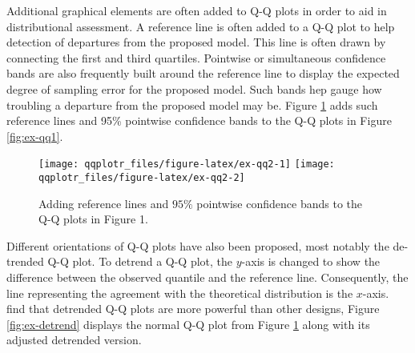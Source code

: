 Additional graphical elements are often added to Q-Q plots in order to
aid in distributional assessment. A reference line is often added to a
Q-Q plot to help detection of departures from the proposed model. This
line is often drawn by connecting the first and third quartiles.
Pointwise or simultaneous confidence bands are also frequently built
around the reference line to display the expected degree of sampling
error for the proposed model. Such bands hep gauge how troubling a
departure from the proposed model may be. Figure \ref{fig:ex-qq2} adds
such reference lines and 95\% pointwise confidence bands to the Q-Q
plots in Figure \ref{fig:ex-qq1}.

\begin{Schunk}
\begin{figure}

{\centering \texttt{[image: qqplotr\_files/figure-latex/ex-qq2-1]} \texttt{[image: qqplotr\_files/figure-latex/ex-qq2-2]} 

}

\caption[Adding reference lines and $95\%$ pointwise confidence bands to the Q-Q plots in Figure 1]{Adding reference lines and $95\%$ pointwise confidence bands to the Q-Q plots in Figure 1.}\label{fig:ex-qq2}
\end{figure}
\end{Schunk}

Different orientations of Q-Q plots have also been proposed, most
notably the de-trended Q-Q plot. To detrend a Q-Q plot, the \(y\)-axis
is changed to show the difference between the observed quantile and the
reference line. Consequently, the line representing the agreement with
the theoretical distribution is the \(x\)-axis. \citet{Loy2016-fg} find
that detrended Q-Q plots are more powerful than other designs,
Figure \ref{fig:ex-detrend} displays the normal Q-Q plot from Figure
\ref{fig:ex-qq2} along with its adjusted detrended version.

